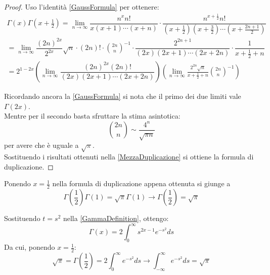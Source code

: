 \begin{proof}
Uso l'identità \cref{GaussFormula} per ottenere:
\begin{equation}
\label{MezzaDuplicazione}
\begin{split}
\Gamma(x)\Gamma\left(x+\frac12\right) = \lim_{n\to\infty} 
\dfrac{n^xn!}{x(x+1)\cdots (x+n)} \cdot \dfrac{n^{x+\frac12} n!}{\left(x+\frac12\right)\left(x+\frac32\right)\cdots \left(x+\frac{2n+1}2\right)}\\
 =\lim_{n\to\infty} \dfrac{(2n)^{2x}}{2^{2x}}\sqrt{n}\cdot (2n)!\cdot\binom{2n}{n}^{-1}\cdot \dfrac{2^{2n+1}}{(2x)(2x+1)\cdots(2x+2n)}\cdot \dfrac{1}{x+\frac12+n} \\
 =2^{1-2x} \left(\lim_{n\to\infty} \dfrac{ (2n)^{2x}(2n)! }{ (2x)(2x+1)\cdots(2x+2n) }\right) 
  \left( \lim_{n\to\infty} \frac{2^{2n}\sqrt{n}}{x+\frac12+n} \binom{2n}{n}^{-1}\right)
\end{split}
\end{equation}

Ricordando ancora la \cref{GaussFormula} si nota che il primo dei due limiti vale $\Gamma(2x)$.\\
Mentre per il secondo basta sfruttare la stima asintotica:
\begin{equation*}
	\binom{2n}{n}\sim \frac{4^n}{\sqrt{\pi n }}
\end{equation*}
per avere che è uguale a $\sqrt{\pi}$.\\
Sostituendo i risultati ottenuti nella \cref{MezzaDuplicazione} si ottiene la formula di duplicazione.
\end{proof}

\begin{remark}
Ponendo $x=\frac12$ nella formula di duplicazione appena ottenuta si giunge a 
\begin{equation*}
  \Gamma\left(\frac12\right)\Gamma(1)=\sqrt{\pi}\Gamma(1) \to \Gamma\left(\frac12\right)=\sqrt{\pi}
\end{equation*}
\end{remark}

\begin{remark}
 \label{GaussIntegral}
 Sostituendo $t=s^2$ nella \cref{GammaDefinition}, ottengo:
 \begin{equation}
  \Gamma(x)=2\int_0^{\infty}{s^{2x-1}e^{-s^2}ds}
 \end{equation}
 Da cui, ponendo $x=\frac{1}{2}$:
 \begin{equation*}
  \sqrt{\pi}=\Gamma\left(\frac{1}{2}\right)=2\int_0^{\infty}{e^{-s^2}ds}\to \int_{-\infty}^{\infty}{e^{-s^2}ds}=\sqrt{\pi}
 \end{equation*}
\end{remark}



